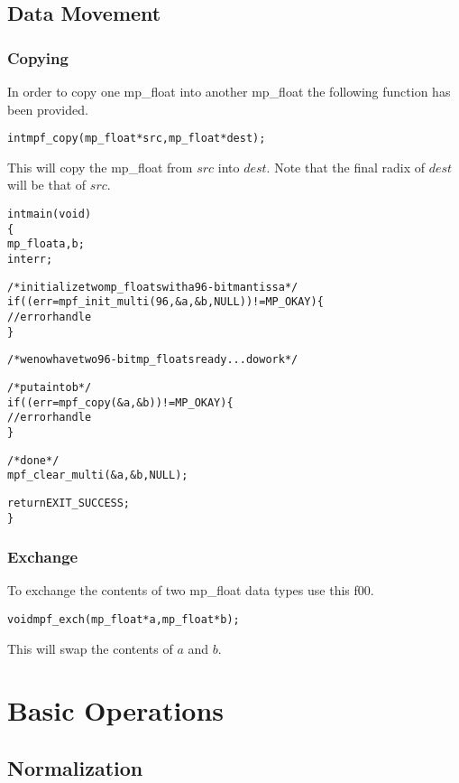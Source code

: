 \documentclass[b5paper]{book}
\begin{document}
\section{Data Movement}
\subsection{Copying}
In order to copy one mp\_float into another mp\_float the following function has been provided.

\begin{alltt}
int  mpf_copy(mp_float *src, mp_float *dest);
\end{alltt}
This will copy the mp\_float from $src$ into $dest$.  Note that the final radix of $dest$ will be that of $src$.

\begin{alltt}
int main(void)
\{
   mp_float a, b;
   int err;

   /* initialize two mp_floats with a 96-bit mantissa */
   if ((err = mpf_init_multi(96, &a, &b, NULL)) != MP_OKAY) \{
      // error handle
   \}

   /* we now have two 96-bit mp_floats ready ... do work */

   /* put a into b */
   if ((err = mpf_copy(&a, &b)) != MP_OKAY) \{
      // error handle
   \}
   
   /* done */
   mpf_clear_multi(&a, &b, NULL);

   return EXIT_SUCCESS;
\}
\end{alltt}

\subsection{Exchange}

To exchange the contents of two mp\_float data types use this f00.

\begin{alltt}
void mpf_exch(mp_float *a, mp_float *b);
\end{alltt}

This will swap the contents of $a$ and $b$.  

\chapter{Basic Operations}
\section{Normalization}
\end{document}
